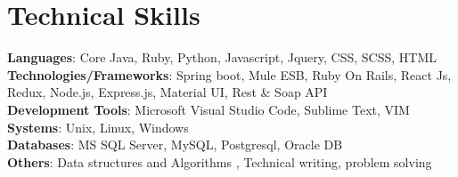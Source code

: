 \documentclass[letterpaper,11pt]{article}
\makeatletter
\newcommand{\resumeItem}[1]{
  \item\small{
    {#1 \vspace{-2pt}}
  }
}
\newcommand{\resumeSubheading}[4]{
  \vspace{-2pt}\item
    \begin{tabular*}{1.0\textwidth}[t]{l@{\extracolsep{\fill}}r}
      \textbf{#1} & \textbf{\small #2} \\
      \textit{\small#3} & \textit{\small #4} \\
    \end{tabular*}\vspace{-7pt}
}
\newcommand{\resumeProjectHeading}[2]{
    \item
    \begin{tabular*}{1.001\textwidth}{l@{\extracolsep{\fill}}r}
      \small#1 & \textbf{\small #2}\\
    \end{tabular*}\vspace{-7pt}
}
\newcommand{\resumeSubHeadingListStart}{\begin{itemize}[leftmargin=0.0in, label={}]}
\newcommand{\resumeSubHeadingListEnd}{\end{itemize}}
\newcommand{\resumeItemListStart}{\begin{itemize}}
\newcommand{\resumeItemListEnd}{\end{itemize}\vspace{-5pt}}
\makeatother
\begin{document}


%
\section{Technical Skills}
 \begin{itemize}[leftmargin=0.15in, label={}]
    \small{\item{
     \textbf{Languages}{: Core Java, Ruby, Python, Javascript, Jquery, CSS, SCSS, HTML} \\
    \textbf{Technologies/Frameworks}{: Spring boot, Mule ESB, Ruby On Rails, React Js, Redux, Node.js, Express.js, Material UI, Rest \& Soap API} \\
    \textbf{Development Tools}{: Microsoft Visual Studio Code, Sublime Text, VIM} \\
    \textbf{Systems}{: Unix, Linux, Windows} \\
    \textbf{Databases}{: MS SQL Server, MySQL, Postgresql, Oracle DB} \\
    \textbf{Others}{: Data structures and Algorithms , Technical writing, problem solving} \\
    }}
 \end{itemize}
 \vspace{-16pt}


        
\end{document}
